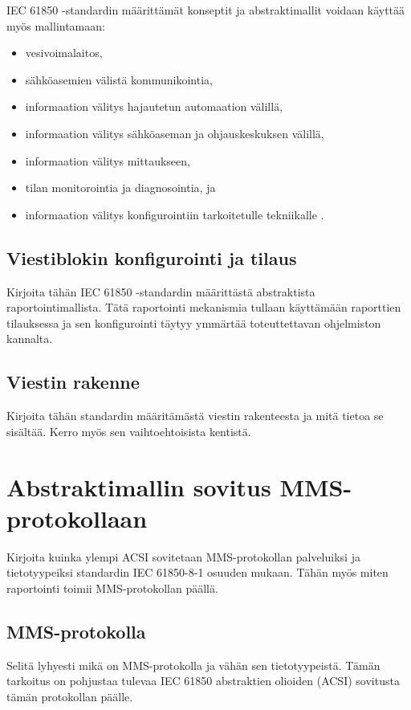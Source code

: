IEC 61850 -standardin määrittämät konseptit ja abstraktimallit voidaan käyttää myös mallintamaan:
\begin{itemize}
	\item vesivoimalaitos,
	\item sähköasemien välistä kommunikointia,
	\item informaation välitys hajautetun automaation välillä,
	\item informaation välitys sähköaseman ja ohjauskeskuksen välillä,
	\item informaation välitys mittaukseen,
	\item tilan monitorointia ja diagnosointia, ja
	\item informaation välitys konfigurointiin tarkoitetulle tekniikalle \cite[s.~11]{IEC61850-7-1}.
\end{itemize}

\subsection{Viestiblokin konfigurointi ja tilaus}
\begin{it}
	Kirjoita tähän IEC 61850 -standardin määrittästä abstraktista raportointimallista. Tätä raportointi mekanismia tullaan käyttämään raporttien tilauksessa ja sen konfigurointi täytyy ymmärtää toteuttettavan ohjelmiston kannalta.
\end{it}

\subsection{Viestin rakenne}
\begin{it}
	Kirjoita tähän standardin määritämästä viestin rakenteesta ja mitä tietoa se sisältää. Kerro myös sen vaihtoehtoisista kentistä.
\end{it}

\section{Abstraktimallin sovitus MMS-protokollaan}
\begin{it}
	Kirjoita kuinka ylempi ACSI sovitetaan MMS-protokollan palveluiksi ja tietotyypeiksi standardin IEC 61850-8-1 osuuden mukaan. Tähän myös miten raportointi toimii MMS-protokollan päällä.
\end{it}

\subsection{MMS-protokolla}
\begin{it}
	Selitä lyhyesti mikä on MMS-protokolla ja vähän sen tietotyypeistä. Tämän tarkoitus on pohjustaa tulevaa IEC 61850 abstraktien olioiden (ACSI) sovitusta tämän protokollan päälle.
\end{it}

